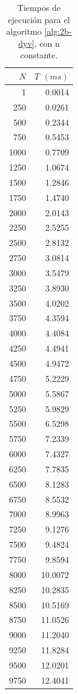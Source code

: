 \begin{table}
	\footnotesize
	\centering
	\begin{tabular}{|r|r|}
		\hline
		$N$ & $T$ $(ms)$ \\
		\hline
        1 & 0.0014 \\ 
		250 & 0.0261 \\ 
		500 & 0.2344 \\ 
		750 & 0.5453 \\ 
		1000 & 0.7709 \\ 
		1250 & 1.0674 \\ 
		1500 & 1.2846 \\ 
		1750 & 1.4740 \\ 
		2000 & 2.0143 \\ 
		2250 & 2.5255 \\ 
		2500 & 2.8132 \\ 
		2750 & 3.0814 \\ 
		3000 & 3.5479 \\ 
		3250 & 3.8930 \\ 
		3500 & 4.0202 \\ 
		3750 & 4.3594 \\ 
		4000 & 4.4084 \\ 
		4250 & 4.4941 \\ 
		4500 & 4.9472 \\ 
		4750 & 5.2229 \\ 
		5000 & 5.5867 \\ 
		5250 & 5.9829 \\ 
		5500 & 6.5298 \\ 
		5750 & 7.2339 \\ 
		6000 & 7.4327 \\ 
		6250 & 7.7835 \\ 
		6500 & 8.1283 \\ 
		6750 & 8.5532 \\ 
		7000 & 8.9963 \\ 
		7250 & 9.1276 \\ 
		7500 & 9.4824 \\ 
		7750 & 9.8594 \\ 
		8000 & 10.0072 \\ 
		8250 & 10.2835 \\ 
		8500 & 10.5169 \\ 
		8750 & 11.0526 \\ 
		9000 & 11.2040 \\ 
		9250 & 11.8284 \\ 
		9500 & 12.0201 \\ 
		9750 & 12.4041 \\ 
		\hline
	\end{tabular}
	\caption{Tiempos de ejecución para el algoritmo 
		\ref{alg:2b-dyv}, con n constante.}
	\label{tab:2b-dyv-k}
\end{table}

